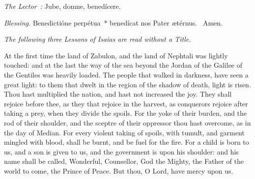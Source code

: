 {{    \emph{The Lector~:} Jube, domne, benedícere.

    \emph{Blessing.} Benedictióne perpétua~* benedícat nos Pater ætérnus. \Rbar{}~Amen.

    \smallskip
    \emph{The following three Lessons of Isaias are read without a Title.}
  }

  \bigskip
  {

    \begin{parcolumns}[rulebetween,colwidths={1=.44\linewidth}]{2}
    {At the first time the land of Zabulon, and the land of Nephtali was lightly touched: and at the last the way of the sea beyond the Jordan of the Galilee of the Gentiles was heavily loaded.
      The people that walked in darkness, have seen a great light: to them that dwelt in the region of the shadow of death, light is risen.
      Thou hast multiplied the nation, and hast not increased the joy. They shall rejoice before thee, as they that rejoice in the harvest, as conquerors rejoice after taking a prey, when they divide the spoils.
      For the yoke of their burden, and the rod of their shoulder, and the sceptre of their oppressor thou hast overcome, as in the day of Median.
      For every violent taking of spoils, with tumult, and garment mingled with blood, shall be burnt, and be fuel for the fire.
      For a child is born to us, and a son is given to us, and the government is upon his shoulder: and his name shall be called, Wonderful, Counsellor, God the Mighty, the Father of the world to come, the Prince of Peace.
      But thou, O Lord, have mercy upon us.}
    \end{parcolumns}

}}
